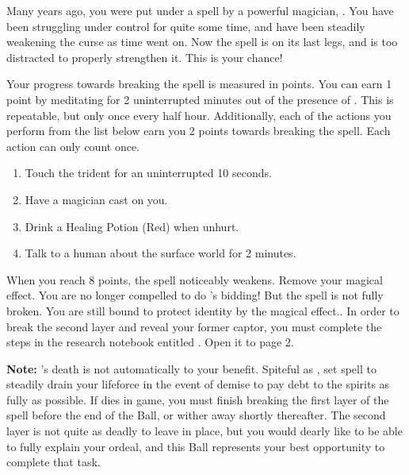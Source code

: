 \documentclass[green]{NeptuneBall}
\begin{document}
\name{\gSpellBreak{}}


Many years ago, you were put under a spell by a powerful magician, \cWitch{}. You have been struggling under \cWitch{\their} control for quite some time, and have been steadily weakening the curse as time went on. Now the spell is on its last legs, and \cWitch{} is too distracted to properly strengthen it. This is your chance!

Your progress towards breaking the spell is measured in points. You can earn 1 point by meditating for 2 uninterrupted minutes out of the presence of \cWitch{}. This is repeatable, but only once every half hour. Additionally, each of the actions you perform from the list below earn you 2 points towards breaking the spell. Each action can only count once.

\begin{enumerate}
\item Touch the trident for an uninterrupted 10 seconds.
\item Have a magician cast \aLesserDispel{} on you.
\item Drink a Healing Potion (Red) when unhurt.
\item Talk to a human about the surface world for 2 minutes.
\end{enumerate}

When you reach 8 points, the spell noticeably weakens. Remove your \iEnslavementSpell{} magical effect. You are no longer compelled to do \cWitch{}'s bidding! But the spell is not fully broken. You are still bound to protect \cWitch{\their} identity by the \iIdentityProtectionSpell{} magical effect.. In order to break the second layer and reveal your former captor, you must complete the steps in the research notebook entitled \nSpellBreakNotebook{}. Open it to page 2.

{\bf Note:} \cWitch{}'s death is not automatically to your benefit. Spiteful as \cWitch{\they} \cWitch{\are}, \cWitch{} set \cWitch{\their} spell to steadily drain your lifeforce in the event of \cWitch{\their} demise to pay \cWitch{\their} debt to the spirits as fully as possible. If \cWitch{} dies in game, you must finish breaking the first layer of the spell before the end of the Ball, or wither away shortly thereafter. The second layer is not quite as deadly to leave in place, but you would dearly like to be able to fully explain your ordeal, and this Ball represents your best opportunity to complete that task.
\end{document}
